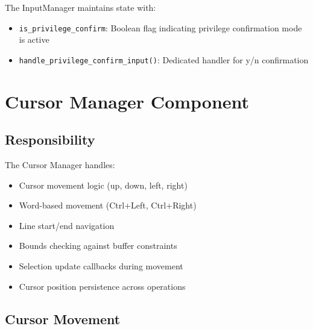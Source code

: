 \documentclass[12pt,a4paper,oneside,openany]{report}
\begin{document}
The InputManager maintains state with:
\begin{itemize}
	\item \texttt{is\_privilege\_confirm}: Boolean flag indicating privilege confirmation mode is active
	\item \texttt{handle\_privilege\_confirm\_input()}: Dedicated handler for y/n confirmation
\end{itemize}

\section{Cursor Manager Component}

\subsection{Responsibility}

The Cursor Manager handles:

\begin{itemize}
	\item Cursor movement logic (up, down, left, right)
	\item Word-based movement (Ctrl+Left, Ctrl+Right)
	\item Line start/end navigation
	\item Bounds checking against buffer constraints
	\item Selection update callbacks during movement
	\item Cursor position persistence across operations
\end{itemize}

\subsection{Cursor Movement}
\end{document}
